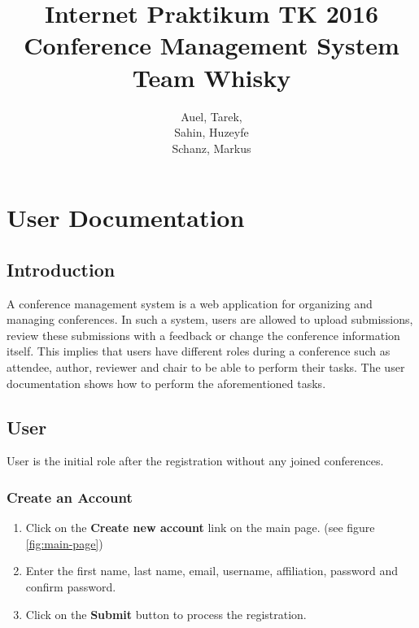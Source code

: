 \documentclass[nochapterpage,nopartpage,noheadingspace,numbersubsubsec,bigchapter,colorback,accentcolor=tud9c,10pt]{tudreport}
\title{Internet Praktikum TK 2016\\ Conference Management System\\ Team Whisky}
\subtitle{Auel, Tarek,\\ Sahin, Huzeyfe\\ Schanz, Markus}
\begin{document}
\maketitle
\tableofcontents


\part{User Documentation}
\label{part:user}

  \chapter{Introduction}
  \label{ch:user:intro}

A conference management system is a web application for organizing and managing conferences. In such a system, users are allowed to upload submissions, review these submissions with a feedback or change the conference information itself. This implies that users have different roles during a conference such as attendee, author, reviewer and chair to be able to perform their tasks. The user documentation shows how to perform the aforementioned tasks.

  \chapter{User}

User is the initial role after the registration without any joined conferences.

	\section{Create an Account}


\begin{enumerate}
	\item	Click on the \textbf{Create new account} link on the main page. (see figure \ref{fig:main-page})
	\item	Enter the first name, last name, email, username, affiliation, password and confirm password.
	\item	Click on the \textbf{Submit} button to process the registration.
\end{enumerate}

\end{document}

